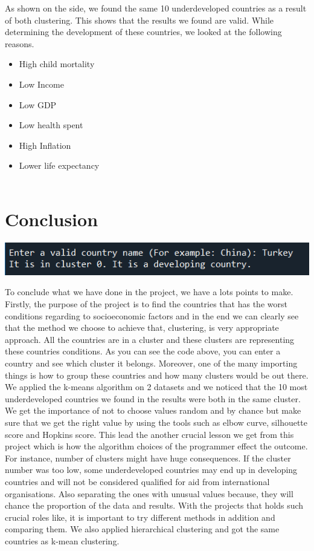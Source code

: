 \documentclass[onecolumn]{article}
\begin{document}
As shown on the side, we found the same 10 underdeveloped countries as a result of both clustering. This shows that the results we found are valid. While determining the development of these countries, we looked at the following reasons.
\begin{itemize}
    \item High child mortality
    \item Low Income
    \item Low GDP
    \item Low health spent
    \item High Inflation
    \item Lower life expectancy\\\\
\end{itemize}

\section{Conclusion}

\begin{center}
    \includegraphics[scale=1.0]{result.png}\\
\end{center}
\normalsize

\large
To conclude what we have done in the project, we have a lots points to make. Firstly, the purpose of the project is to find the countries that has the worst conditions regarding to socioeconomic factors and in the end we can clearly see that the method we choose to achieve that, clustering, is very appropriate approach. All the countries are in a cluster and these clusters are representing these countries conditions. As you can see the code above, you can enter a country and see which cluster it belongs. Moreover, one of the many importing things is how to group these countries and how many clusters would be out there. We applied the k-means algorithm on 2 datasets and we noticed that the 10 most underdeveloped countries we found in the results were both in the same cluster.\\

We get the importance of not to choose values random and by chance but make sure that we get the right value by using the tools such as elbow curve, silhouette score and Hopkins score. This lead the another crucial lesson we get from this project which is how the algorithm choices of the programmer effect the outcome. For instance, number of clusters might have huge consequences. If the cluster number was too low, some underdeveloped countries may end up in developing countries and will not be considered qualified for aid from international organisations. Also separating the ones with unusual values because, they will chance the proportion of the data and results. With the projects that holds such crucial roles like, it is important to try different methods in addition and comparing them. We also applied hierarchical clustering and got the same countries as k-mean clustering.
\end{document}
